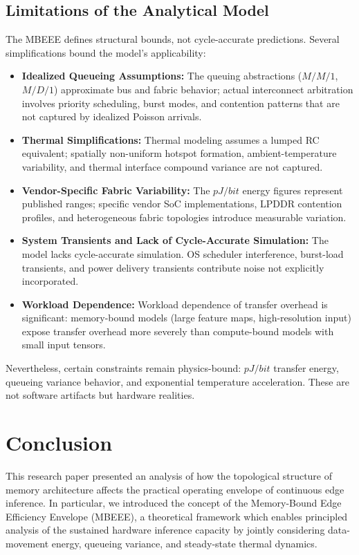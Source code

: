 \documentclass[conference]{IEEEtran}
\begin{document}
\subsection{Limitations of the Analytical Model}
The MBEEE defines structural bounds, not cycle-accurate predictions. Several simplifications bound the model's applicability:

\begin{itemize}
    \item \textbf{Idealized Queueing Assumptions:} The queuing abstractions ($M/M/1$, $M/D/1$) approximate bus and fabric behavior; actual interconnect arbitration involves priority scheduling, burst modes, and contention patterns that are not captured by idealized Poisson arrivals.
    \item \textbf{Thermal Simplifications:} Thermal modeling assumes a lumped RC equivalent; spatially non-uniform hotspot formation, ambient-temperature variability, and thermal interface compound variance are not captured.
    \item \textbf{Vendor-Specific Fabric Variability:} The $pJ/bit$ energy figures represent published ranges; specific vendor SoC implementations, LPDDR contention profiles, and heterogeneous fabric topologies introduce measurable variation.
    \item \textbf{System Transients and Lack of Cycle-Accurate Simulation:} The model lacks cycle-accurate simulation. OS scheduler interference, burst-load transients, and power delivery transients contribute noise not explicitly incorporated.
    \item \textbf{Workload Dependence:} Workload dependence of transfer overhead is significant: memory-bound models (large feature maps, high-resolution input) expose transfer overhead more severely than compute-bound models with small input tensors.
\end{itemize}

Nevertheless, certain constraints remain physics-bound: $pJ/bit$ transfer energy, queueing variance behavior, and exponential temperature acceleration. These are not software artifacts but hardware realities.

\section{Conclusion}
This research paper presented an analysis of how the topological structure of memory architecture affects the practical operating envelope of continuous edge inference. In particular, we introduced the concept of the Memory-Bound Edge Efficiency Envelope (MBEEE), a theoretical framework which enables principled analysis of the sustained hardware inference capacity by jointly considering data-movement energy, queueing variance, and steady-state thermal dynamics.
\end{document}

